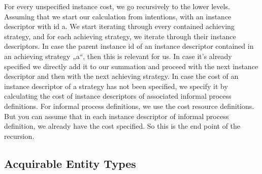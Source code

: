 For every unspecified instance cost, we go recursively to the lower levels. Assuming that we start our calculation from intentions, with an instance descriptor with id a. We start iterating through every contained achieving strategy, and for each achieving strategy, we iterate through their instance descriptors. In case the parent instance id of an instance descriptor contained in an achieving strategy „a“, then this is relevant for us. In case it’s already specified we directly add it to our summation and proceed with the next instance descriptor and then with the next achieving strategy. In case the cost of an instance descriptor of a strategy has not been specified, we specify it by calculating the cost of instance descriptors of associated informal process definitions. For informal process definitions, we use the cost resource definitions. But you can assume that in each instance descriptor of informal process definition, we already have the cost specified. So this is the end point of the recursion.

\subsection{Acquirable Entity Types}
\label{sec:acquirableentities}



